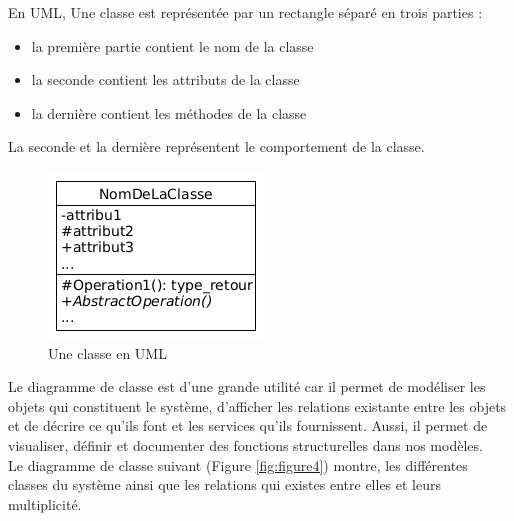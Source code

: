 \documentclass[12pt,a4paper]{article}
\begin{document}
	En UML, Une classe est représentée par un rectangle séparé en trois parties :
	\begin{itemize}
		\item la première partie contient le nom de la classe
		\item la seconde contient les attributs de la classe
		\item la dernière contient les méthodes de la classe
	\end{itemize}
	La seconde et la dernière représentent le comportement de la classe.
	\begin{figure}[H]
		\centering
		\includegraphics[width=.25\textwidth]{./images/class}
		\caption{Une classe en UML}
		\label{fig:figure2}
	\end{figure}

	Le diagramme de classe est d'une grande utilité car il permet de modéliser les objets qui constituent le système, d'afficher les relations existante entre les objets et de décrire ce qu’ils font et les services qu’ils fournissent. Aussi, il permet de visualiser, définir et documenter des fonctions structurelles dans nos modèles.\\
	Le diagramme de classe suivant (Figure \ref{fig:figure4}) montre, les différentes classes du système ainsi que les relations qui existes entre elles et leurs multiplicité.
	
\end{document}
